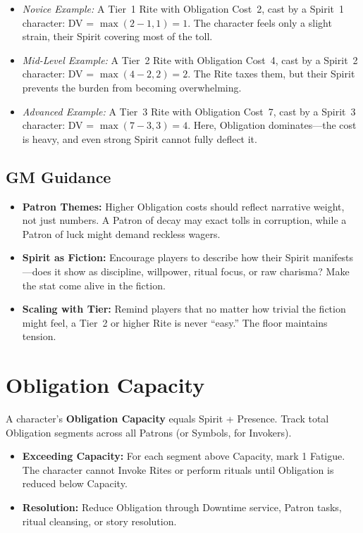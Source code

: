\begin{itemize}
  \item \emph{Novice Example:} A Tier~1 Rite with Obligation Cost~2, cast by a Spirit~1 character:
  DV = $\max(2-1, 1) = 1$.
  The character feels only a slight strain, their Spirit covering most of the toll.

  \item \emph{Mid-Level Example:} A Tier~2 Rite with Obligation Cost~4, cast by a Spirit~2 character:
  DV = $\max(4-2, 2) = 2$.
  The Rite taxes them, but their Spirit prevents the burden from becoming overwhelming.

  \item \emph{Advanced Example:} A Tier~3 Rite with Obligation Cost~7, cast by a Spirit~3 character:
  DV = $\max(7-3, 3) = 4$.
  Here, Obligation dominates—the cost is heavy, and even strong Spirit cannot fully deflect it.
\end{itemize}

\subsection*{GM Guidance}

\begin{itemize}
  \item \textbf{Patron Themes:} Higher Obligation costs should reflect narrative weight, not just numbers. A Patron of decay may exact tolls in corruption, while a Patron of luck might demand reckless wagers.
  \item \textbf{Spirit as Fiction:} Encourage players to describe how their Spirit manifests—does it show as discipline, willpower, ritual focus, or raw charisma? Make the stat come alive in the fiction.
  \item \textbf{Scaling with Tier:} Remind players that no matter how trivial the fiction might feel, a Tier~2 or higher Rite is never “easy.” The floor maintains tension.
\end{itemize}

\section{Obligation Capacity}

A character’s \textbf{Obligation Capacity} equals Spirit + Presence.
Track total Obligation segments across all Patrons (or Symbols, for Invokers).

\begin{itemize}
  \item \textbf{Exceeding Capacity:} For each segment above Capacity, mark 1 Fatigue. The character cannot Invoke Rites or perform rituals until Obligation is reduced below Capacity.
  \item \textbf{Resolution:} Reduce Obligation through Downtime service, Patron tasks, ritual cleansing, or story resolution.
\end{itemize}

